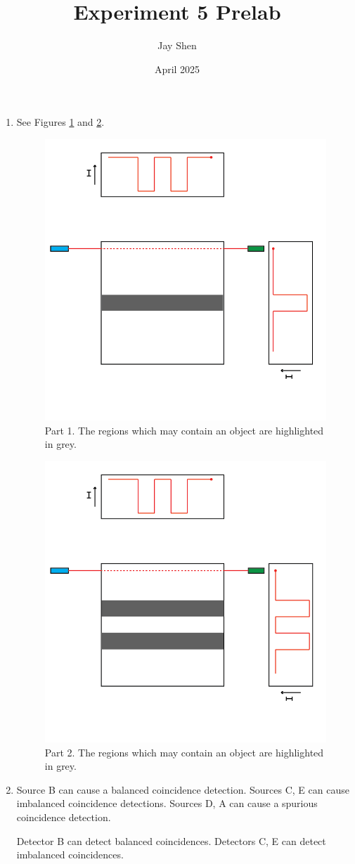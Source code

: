 \documentclass[12pt, letterpaper]{article}
\title{Experiment 5 Prelab}
\author{Jay Shen}
\date{April 2025}
\begin{document}
\begin{enumerate}

\maketitle

\item{
    See Figures \ref{fig:1.1} and \ref{fig:1.2}. 
    \begin{figure}
        \centering
        \includegraphics[width=0.4\linewidth]{experiment5/figures/prelab1-1.png}
        \caption{Part 1. The regions which may contain an object are highlighted in grey. }
        \label{fig:1.1}
    \end{figure}
    \begin{figure}
        \centering
        \includegraphics[width=0.4\linewidth]{experiment5/figures/prelab1-2.png}
        \caption{Part 2. The regions which may contain an object are highlighted in grey.}
        \label{fig:1.2}
    \end{figure}
}

\item{

    Source B can cause a balanced coincidence detection. Sources C, E can cause imbalanced coincidence detections. Sources D, A can cause a spurious coincidence detection. 

    Detector B can detect balanced coincidences. Detectors C, E can detect imbalanced coincidences. 

}
    
\end{enumerate}
\end{document}
